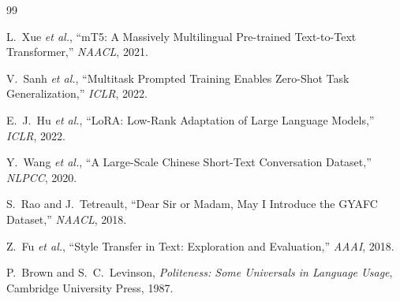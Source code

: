 \documentclass[12pt,a4paper]{ctexart}
\begin{document}
\begin{thebibliography}{99}

L.~Xue \emph{et al.}, ``mT5: A Massively Multilingual Pre-trained Text-to-Text Transformer,'' \emph{NAACL}, 2021.

V.~Sanh \emph{et al.}, ``Multitask Prompted Training Enables Zero-Shot Task Generalization,'' \emph{ICLR}, 2022.

E.~J.~Hu \emph{et al.}, ``LoRA: Low-Rank Adaptation of Large Language Models,'' \emph{ICLR}, 2022.

Y.~Wang \emph{et al.}, ``A Large-Scale Chinese Short-Text Conversation Dataset,'' \emph{NLPCC}, 2020.

S.~Rao and J.~Tetreault, ``Dear Sir or Madam, May I Introduce the GYAFC Dataset,'' \emph{NAACL}, 2018.

Z.~Fu \emph{et al.}, ``Style Transfer in Text: Exploration and Evaluation,'' \emph{AAAI}, 2018.

P.~Brown and S.~C.~Levinson, \emph{Politeness: Some Universals in Language Usage}, Cambridge University Press, 1987.

\end{thebibliography}
\end{document}
